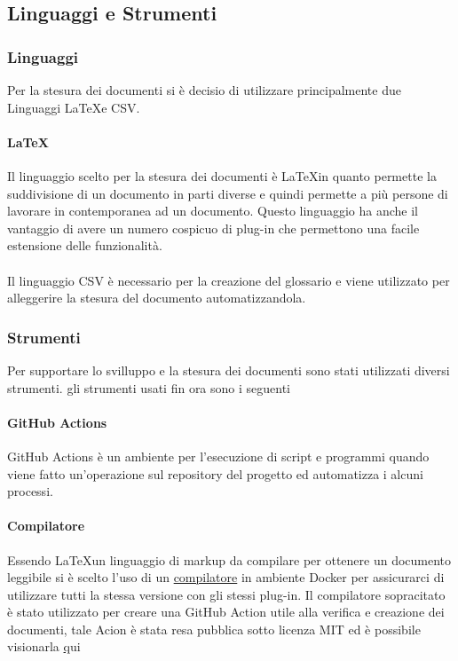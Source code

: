   \subsection{Linguaggi e Strumenti}
  \subsubsection{Linguaggi}
  Per la stesura dei documenti si è decisio di utilizzare principalmente due Linguaggi
  \LaTeX e CSV\glos.
  \paragraph{\LaTeX}
  Il linguaggio scelto per la stesura dei documenti è \LaTeX \space in quanto permette
  la suddivisione di un documento in parti diverse e quindi permette a più persone
  di lavorare in contemporanea ad un documento.
  Questo linguaggio ha anche il vantaggio di avere un numero cospicuo di plug-in
  che permettono una facile estensione delle funzionalità.
  \paragraph{\CSV}
  Il linguaggio CSV è necessario per la creazione del glossario e viene utilizzato
  per alleggerire la stesura del documento automatizzandola.

  \subsubsection{Strumenti}
  Per supportare lo svilluppo e la stesura dei documenti sono stati utilizzati diversi
  strumenti.
  gli strumenti usati fin ora sono i seguenti

  \paragraph{GitHub Actions}
  GitHub Actions è un ambiente per l'esecuzione di script e programmi quando viene
  fatto un'operazione sul repository del progetto ed automatizza i alcuni processi.

  \paragraph{Compilatore}
  Essendo \LaTeX \space un linguaggio di markup da compilare per ottenere un documento
  leggibile si è scelto l'uso di un
  \href{https://github.com/dante-ev/docker-texlive}{compilatore} in ambiente Docker\glo
  per assicurarci di utilizzare tutti la stessa versione con gli stessi plug-in.
  Il compilatore sopracitato è stato utilizzato per creare una GitHub Action utile
  alla verifica e creazione dei documenti, tale Acion è stata resa pubblica sotto licenza MIT
  ed è possibile visionarla \href{https://github.com/Jatus93/Latex-multicompiler}qui

